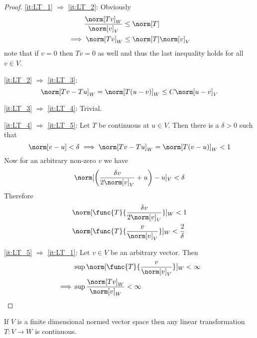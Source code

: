 \begin{proof}
    \cref{it:LT_1} \(\Rightarrow\) \cref{it:LT_2}: Obviously
    \begin{align*}
        \dfrac{\norm[Tv]_W}{\norm[v]_V} & \leq \norm[T]            \\
        \implies \norm[Tv]_W            & \leq \norm[T] \norm[v]_V
    \end{align*}
    note that if \(v = 0\) then \(Tv = 0\) as well and thus the last inequality holds for all \(v \in V\).

    \cref{it:LT_2} \(\Rightarrow\) \cref{it:LT_3}:
    \begin{equation*}
        \norm[Tv - Tu]_W = \norm[T(u - v)]_W \leq C \norm[u - v]_V
    \end{equation*}

    \cref{it:LT_3} \(\Rightarrow\) \cref{it:LT_4}: Trivial.

    \cref{it:LT_4} \(\Rightarrow\) \cref{it:LT_5}: Let \(T\) be continuous at \(u \in V\). Then there is  a \(\delta > 0 \) such that
    \begin{equation*}
        \norm[v-u] < \delta \implies \norm[Tv - Tu]_W = \norm[T(v-u)]_W < 1
    \end{equation*}
    Now for an arbitrary non-zero \(v\) we have
    \begin{equation*}
        \norm[\left( \dfrac{\delta v}{2\norm[v]_V} + u \right) - u]_V < \delta
    \end{equation*}
    Therefore
    \begin{align*}
         & \norm[\func{T}{\dfrac{\delta v}{2\norm[v]_V}}]_W  < 1         \\
         & \norm[\func{T}{\dfrac{v}{\norm[v]_V}}]_W  < \dfrac{2}{\delta}
    \end{align*}

    \cref{it:LT_5} \(\Rightarrow\) \cref{it:LT_1}: Let \(v \in V\) be an arbitrary vector. Then
    \begin{align*}
                 & \sup \norm[\func{T}{\dfrac{v}{\norm[v]_V}}]_W < \infty \\
        \implies & \sup \dfrac{\norm[Tv]_W}{\norm[v]_W} < \infty
    \end{align*}

\end{proof}




\begin{theorem} \label{th:finiteDimensionTransformationContinuous}
    If \(V\) is a finite dimensional normed vector space then any linear transformation \(T : V \to W\) is continuous.
\end{theorem}

